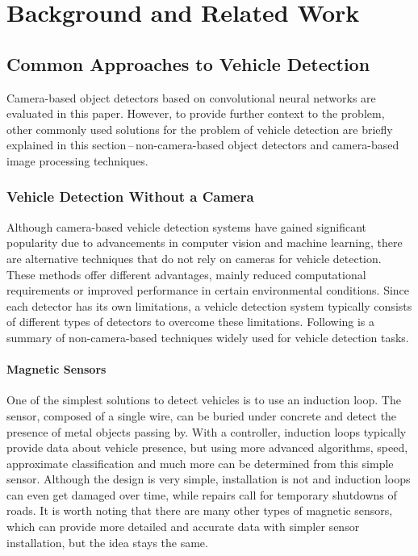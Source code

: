 \chapter{Background and Related Work}
\label{BackgroundAndRelatedWork}


\section{Common Approaches to Vehicle Detection}

Camera-based object detectors based on convolutional neural networks are
evaluated in this paper. However, to provide further context to the problem,
other commonly used solutions for the problem of vehicle detection are briefly
explained in this section\,--\,non-camera-based object detectors and
camera-based image processing techniques.


\subsection{Vehicle Detection Without a Camera}

Although camera-based vehicle detection systems have gained significant
popularity due to advancements in computer vision and machine learning, there
are alternative techniques that do not rely on cameras for vehicle detection.
These methods offer different advantages, mainly reduced computational
requirements or improved performance in certain environmental conditions. Since
each detector has its own limitations, a vehicle detection system typically
consists of different types of detectors to overcome these limitations.
Following is a summary of non-camera-based techniques widely used for vehicle
detection tasks.


\subsubsection*{Magnetic Sensors}

One of the simplest solutions to detect vehicles is to use an induction
loop.\cite{MagneticSensors} The sensor, composed of a single wire, can be buried
under concrete and detect the presence of metal objects passing by. With a
controller, induction loops typically provide data about vehicle presence, but
using more advanced algorithms, speed, approximate classification and much more
can be determined from this simple sensor. Although the design is very simple,
installation is not and induction loops can even get damaged over time, while
repairs call for temporary shutdowns of roads. It is worth noting that there
are many other types of magnetic sensors, which can provide more detailed and
accurate data with simpler sensor installation, but the idea stays the same.


